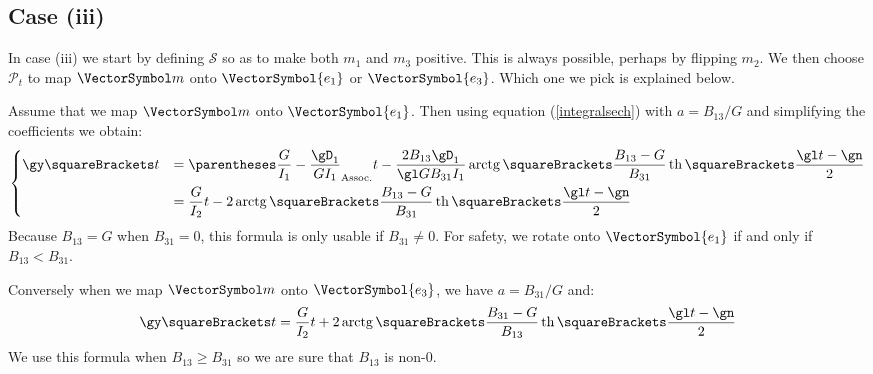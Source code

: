 \documentclass[10pt, a4paper, twoside]{basestyle}
\begin{document}
\subsection*{Case (iii)}
In case (iii) we start by defining $\mathscr S$ so as to make both $m_1$ and $m_3$ positive.  This is always possible, perhaps by flipping $m_2$.  We then
choose $\mathscr P_t$ to map $\vm$ onto $\VectorSymbol{e_1}$ or $\VectorSymbol{e_3}$.  Which one we pick is explained below.

Assume that we map $\vm$ onto $\VectorSymbol{e_1}$.  Then using equation (\ref{integralsech}) with $a = B_{13}/G$ and simplifying the coefficients we obtain:
\[
\begin{dcases}
\gy\of{t} &= \pa{\frac{G}{I_1} - \frac{\gD_1}{G I_1}}t - \frac{2 B_{13} \gD_1}{\gl G B_{31} I_1} 
\InverseTrigonometricTangent\of{\frac{B_{13} - G}{B_{31}} \HyperbolicTangent\of{\frac{\gl t - \gn}{2}}} \\
&= \frac{G}{I_2}t - 2 \InverseTrigonometricTangent\of{\frac{B_{13} - G}{B_{31}} \HyperbolicTangent\of{\frac{\gl t - \gn}{2}}}
\end{dcases}
\]
Because $B_{13} = G$ when $B_{31} = 0$, this formula is only usable if $B_{31} \neq 0$.  For safety, we rotate onto $\VectorSymbol{e_1}$ 
if and only if $B_{13} < B_{31}$.

Conversely when we map $\vm$ onto $\VectorSymbol{e_3}$, we have $a = B_{31}/G$ and:
\[
\gy\of{t} = \frac{G}{I_2}t + 2 \InverseTrigonometricTangent\of{\frac{B_{31} - G}{B_{13}} \HyperbolicTangent\of{\frac{\gl t - \gn}{2}}}
\]
We use this formula when $B_{13} \geq B_{31}$ so we are sure that $B_{13}$ is non-$0$.

\printbibliography
\end{document}

